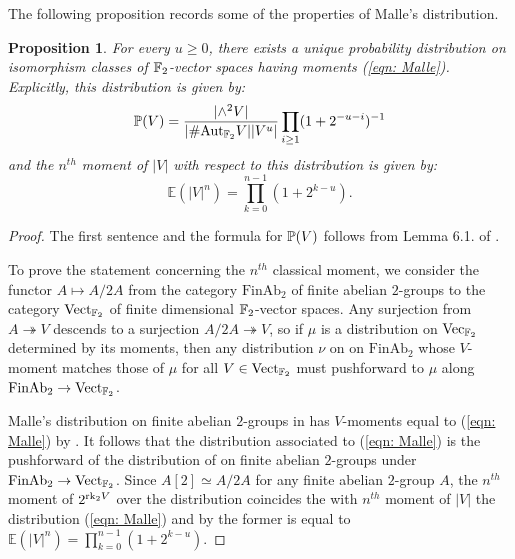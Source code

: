 \documentclass[11pt,a4paper]{amsart}
\def\F{{\rm \mathbb{F}}}
\def\P{{\rm \mathbb{P}}}
\def\Aut{{\rm Aut}}
\def\rk{{\rm rk}}
\numberwithin{equation}{section}
\newtheorem{proposition}[theorem]{Proposition}
\begin{document}
The following proposition records some of the properties of Malle's distribution.   



\begin{proposition} \label{prop: main distribution}
    For every $u \ge 0$, there exists a unique probability distribution on isomorphism classes of $\F_2$-vector spaces having moments (\ref{eqn: Malle}). Explicitly, this distribution is given by: 
    $$
    \P(V) = \frac{\lvert \wedge^2 V \rvert}{\lvert \# \Aut_{\F_2} V \rvert \lvert V^{u} \rvert} \prod_{i \ge 1} (1+2^{-u-i})^{-1}
    $$
    and the $n^{th}$ moment of $\lvert V \rvert$ with respect to this distribution is given by: $$\mathbb{E}(\lvert V \rvert^n) = \prod_{k=0}^{n-1} (1+2^{k-u}).$$

\end{proposition}
\begin{proof}
The first sentence and the formula for $\P(V)$ follows from Lemma 6.1. of \cite{SawinWood}. 


To prove the statement concerning the $n^{th}$ classical moment, we consider the functor $A \mapsto A/2A$ from  the category $\mathrm{FinAb}_2$ of finite abelian $2$-groups to the category $\mathrm{Vect}_{\F_2}$ of finite dimensional $\F_2$-vector spaces. Any surjection from $A \twoheadrightarrow V$ descends to a surjection $A/2A \twoheadrightarrow V$, so if $\mu$ is a distribution on $\mathrm{Vec}_{\F_2}$ determined by its moments, then any distribution $\nu$ on on $\mathrm{FinAb}_2$ whose $V$-moment matches those of $\mu$ for all $V \in \mathrm{Vect}_{\F_2}$ must pushforward to $\mu$ along $\mathrm{FinAb}_2 \rightarrow \mathrm{Vect}_{\F_2}$. 


Malle's distribution on finite abelian $2$-groups in \cite[Conjecture 2.1]{Malle2010} has $V$-moments equal to (\ref{eqn: Malle}) by \cite[Lemma 12.5.]{SawinWood}. It follows that the distribution associated to (\ref{eqn: Malle}) is the pushforward of the distribution of \cite[Conjecture 2.1.]{Malle2010} on finite abelian $2$-groups under $\mathrm{FinAb}_2 \rightarrow \mathrm{Vect}_{\F_2}$. Since $A[2] \simeq A/2A$ for any finite abelian $2$-group $A$,  the $n^{th}$ moment of $2^{\rk_2 V}$ over the distribution \cite[Conjecture 2.1.]{Malle2010} coincides the with $n^{th}$ moment of $\lvert V \rvert$ the distribution (\ref{eqn: Malle}) and by \cite[Proposition 2.2.]{Malle2010} the former is equal to $\mathbb{E}(\lvert V \rvert^n) = \prod_{k=0}^{n-1} (1+2^{k-u})$. 
\end{proof}
\end{document}
